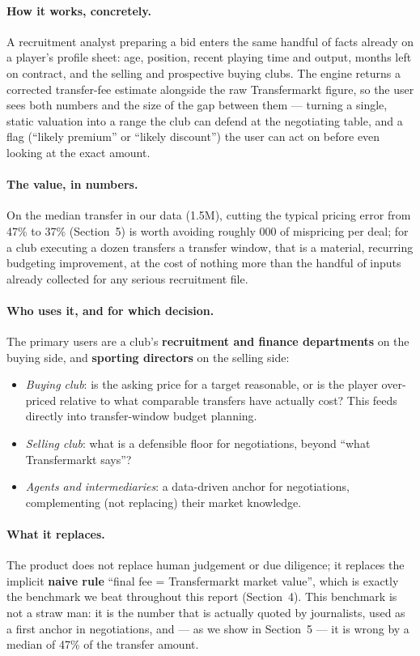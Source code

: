 \documentclass[11pt]{article}
\begin{document}
\paragraph{How it works, concretely.} A recruitment analyst preparing a bid
enters the same handful of facts already on a player's profile sheet: age,
position, recent playing time and output, months left on contract, and the
selling and prospective buying clubs. The engine returns a corrected
transfer-fee estimate alongside the raw Transfermarkt figure, so the user
sees both numbers and the size of the gap between them --- turning a single,
static valuation into a range the club can defend at the negotiating table,
and a flag (``likely premium'' or ``likely discount'') the user can act on
before even looking at the exact amount.

\paragraph{The value, in numbers.} On the median transfer in our data
(\texteuro 1.5M), cutting the typical pricing error from 47\% to 37\%
(Section~5) is worth avoiding roughly 000 of mispricing per
deal; for a club executing a dozen transfers a transfer window, that is a
material, recurring budgeting improvement, at the cost of nothing more than
the handful of inputs already collected for any serious recruitment file.

\paragraph{Who uses it, and for which decision.} The primary users are a club's
\textbf{recruitment and finance departments} on the buying side, and
\textbf{sporting directors} on the selling side:
\begin{itemize}
    \item \emph{Buying club}: is the asking price for a target reasonable, or is
    the player over-priced relative to what comparable transfers have actually
    cost? This feeds directly into transfer-window budget planning.
    \item \emph{Selling club}: what is a defensible floor for negotiations,
    beyond ``what Transfermarkt says''?
    \item \emph{Agents and intermediaries}: a data-driven anchor for
    negotiations, complementing (not replacing) their market knowledge.
\end{itemize}

\paragraph{What it replaces.} The product does not replace human judgement or
due diligence; it replaces the implicit \textbf{naive rule} ``final fee =
Transfermarkt market value'', which is exactly the benchmark we beat
throughout this report (Section~4). This benchmark is not a straw man: it is
the number that is actually quoted by journalists, used as a first anchor in
negotiations, and --- as we show in Section~5 --- it is wrong by a median of
47\% of the transfer amount.
\end{document}
